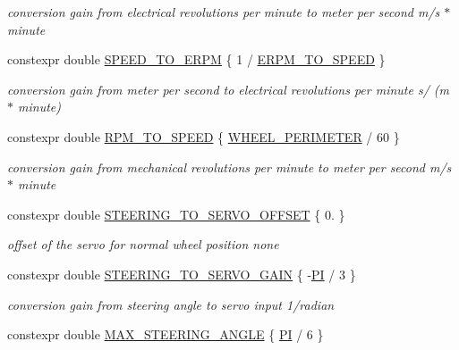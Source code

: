 \begin{DoxyCompactItemize}
\begin{DoxyCompactList}\small\item\em conversion gain from electrical revolutions per minute to meter per second  m/s $\ast$ minute \end{DoxyCompactList}\item 
constexpr double \hyperlink{namespacecar__config_a0f37aa7e52366aebb006c6e1d3317900}{S\+P\+E\+E\+D\+\_\+\+T\+O\+\_\+\+E\+R\+PM} \{ 1 / \hyperlink{namespacecar__config_af33b95798967e7193927782fd91d36ce}{E\+R\+P\+M\+\_\+\+T\+O\+\_\+\+S\+P\+E\+ED} \}
\begin{DoxyCompactList}\small\item\em conversion gain from meter per second to electrical revolutions per minute  s/ (m $\ast$ minute) \end{DoxyCompactList}\item 
constexpr double \hyperlink{namespacecar__config_aee034b6adfd7932f245bc94d869f2bb6}{R\+P\+M\+\_\+\+T\+O\+\_\+\+S\+P\+E\+ED} \{ \hyperlink{namespacecar__config_a46fe00906da07d2e030b586a634cd907}{W\+H\+E\+E\+L\+\_\+\+P\+E\+R\+I\+M\+E\+T\+ER} / 60 \}
\begin{DoxyCompactList}\small\item\em conversion gain from mechanical revolutions per minute to meter per second  m/s $\ast$ minute \end{DoxyCompactList}\item 
constexpr double \hyperlink{namespacecar__config_abb6ef746663276219b321683dfbb8896}{S\+T\+E\+E\+R\+I\+N\+G\+\_\+\+T\+O\+\_\+\+S\+E\+R\+V\+O\+\_\+\+O\+F\+F\+S\+ET} \{ 0. \}
\begin{DoxyCompactList}\small\item\em offset of the servo for normal wheel position  none \end{DoxyCompactList}\item 
constexpr double \hyperlink{namespacecar__config_aa8ab85fe7b8ab728f34d15028f114d86}{S\+T\+E\+E\+R\+I\+N\+G\+\_\+\+T\+O\+\_\+\+S\+E\+R\+V\+O\+\_\+\+G\+A\+IN} \{ -\/\hyperlink{namespacecar__config_a90cb9957197db8924811c447bc98703a}{PI} / 3 \}
\begin{DoxyCompactList}\small\item\em conversion gain from steering angle to servo input  1/radian \end{DoxyCompactList}\item 
constexpr double \hyperlink{namespacecar__config_a967b325af26effe80fbbc64dc68a36a0}{M\+A\+X\+\_\+\+S\+T\+E\+E\+R\+I\+N\+G\+\_\+\+A\+N\+G\+LE} \{ \hyperlink{namespacecar__config_a90cb9957197db8924811c447bc98703a}{PI} / 6 \}

\end{DoxyCompactItemize}
